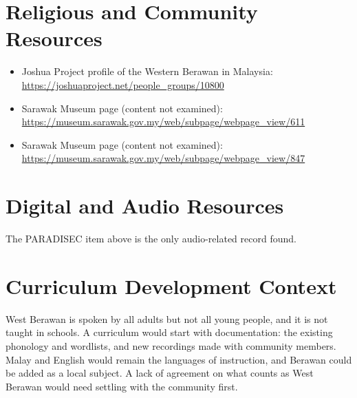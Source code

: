 \documentclass[12pt]{article}
\begin{document}
\section{Religious and Community Resources}
\begin{itemize}
\item Joshua Project profile of the Western Berawan in Malaysia: \url{https://joshuaproject.net/people_groups/10800}
\item Sarawak Museum page (content not examined): \url{https://museum.sarawak.gov.my/web/subpage/webpage_view/611}
\item Sarawak Museum page (content not examined): \url{https://museum.sarawak.gov.my/web/subpage/webpage_view/847}
\end{itemize}

\section{Digital and Audio Resources}
The PARADISEC item above is the only audio-related record found.

\section{Curriculum Development Context}
West Berawan is spoken by all adults but not all young people, and it is not taught in schools. A curriculum would start with documentation: the existing phonology and wordlists, and new recordings made with community members. Malay and English would remain the languages of instruction, and Berawan could be added as a local subject. A lack of agreement on what counts as West Berawan would need settling with the community first.
\end{document}
